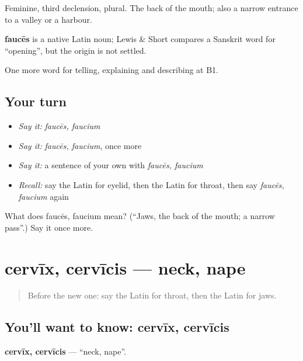 Feminine, third declension, plural. The back of the mouth; also a narrow entrance to a valley or a harbour.

\begin{cousinweb}
\textbf{faucēs} is a native Latin noun; Lewis \& Short compares a Sanskrit word for \textquotedblleft{}opening\textquotedblright{}, but the origin is not settled.
\end{cousinweb}

\begin{grammarlens}[title={What you've built}]
One more word for telling, explaining and describing at B1.
\end{grammarlens}

\subsection*{Your turn}
\begin{itemize}
\raggedright
  \item \emph{Say it:} \emph{faucēs, faucium}
  \item \emph{Say it:} \emph{faucēs, faucium}, once more
  \item \emph{Say it:} a sentence of your own with \emph{faucēs, faucium}
  \item \emph{Recall:} say the Latin for eyelid, then the Latin for throat, then say \emph{faucēs, faucium} again
\end{itemize}

\begin{tcolorbox}[breakable,colback=teal!4,colframe=teal!35!black,title={Before you move on}]
What does faucēs, faucium mean? (\textquotedblleft{}Jaws, the back of the mouth; a narrow pass\textquotedblright{}.) Say it once more.
\end{tcolorbox}
\section[cervīx, cervīcis]{cervīx, cervīcis — neck, nape}

\label{lesson:LA-C516-cervix}



\begin{quote}
Before the new one: say the Latin for throat, then the Latin for jaws.
\end{quote}

\subsection*{You'll want to know: cervīx, cervīcis}
\textbf{cervīx, cervīcis} — \textquotedblleft{}neck, nape\textquotedblright{}.

